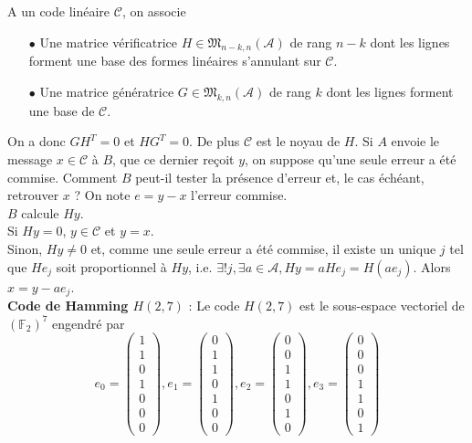 A un code linéaire $\mathcal C$, on associe
\begin{itemize}
\item[$\bullet$] Une matrice vérificatrice $H\in \mathfrak M_{n-k,n}(\mathcal A)$ de rang $n-k$ dont les lignes forment une base des formes linéaires s'annulant sur $\mathcal C$.
\item[$\bullet$] Une matrice génératrice $G\in \mathfrak M_{k,n}(\mathcal A)$ de rang $k$ dont les lignes forment une base de $\mathcal C$.\\
\end{itemize}

On a donc $GH^T = 0$ et $HG^T=0$. De plus $\mathcal C$ est le noyau de $H$. Si $A$ envoie le message $x\in \mathcal C$ à $B$, que ce dernier reçoit $y$, on suppose qu'une seule erreur a été commise. Comment $B$ peut-il tester la présence d'erreur et, le cas échéant, retrouver $x$ ? On note $e=y-x$ l'erreur commise.\\

$B$ calcule $Hy$. \\
Si $Hy=0$, $y\in \mathcal C$ et $y=x$.\\
Sinon, $Hy\neq 0$ et, comme une seule erreur a été commise, il existe un unique $j$ tel que $He_j$ soit proportionnel à $Hy$, i.e. $\exists ! j, \exists a\in \mathcal A, Hy=aHe_j = H(ae_j)$. Alors $x=y-ae_j$.\\

\textbf{Code de Hamming $H(2,7)$} : Le code $H(2,7)$ est le sous-espace vectoriel de $(\mathbb F_2)^7$ engendré par
\[e_0=\begin{pmatrix}1 \\ 1\\ 0 \\ 1 \\ 0\\0 \\0 \end{pmatrix},
 e_1=\begin{pmatrix}0 \\1 \\ 1\\ 0 \\ 1 \\ 0\\0  \end{pmatrix},
e_2=\begin{pmatrix}0\\0\\ 1 \\ 1\\ 0 \\ 1 \\ 0 \end{pmatrix},
e_3=\begin{pmatrix}0\\0\\0\\ 1 \\ 1\\ 0 \\ 1 \end{pmatrix}\] 
 
